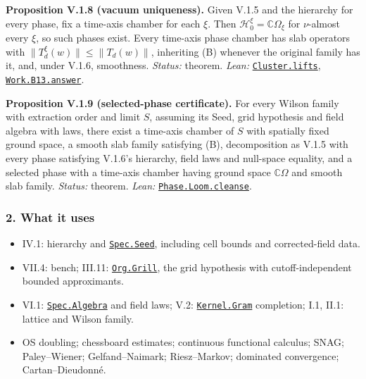 \documentclass[
  letterpaper,
  11pt]{article}
\providecommand{\tightlist}{%
  \setlength{\itemsep}{0pt}\setlength{\parskip}{0pt}}
\begin{document}
\textbf{Proposition V.1.8 (vacuum uniqueness).} Given V.1.5 and the
hierarchy for every phase, fix a time-axis chamber for each \(\xi\).
Then \(\mathcal H_0^\xi=\mathbb C\Omega_\xi\) for \(\nu\)-almost every
\(\xi\), so such phases exist. Every time-axis phase chamber has slab
operators with \(\|T_d^\xi(w)\|\le\|T_d(w)\|\), inheriting (B) whenever
the original family has it, and, under V.1.6, smoothness. \emph{Status:}
theorem. \emph{Lean:}
\href{https://github.com/yang-mills-group/OpenAI-YM-20261028/blob/3456e5e75cf8d4cd558955a5c7638fba2d68f464/YM/Phase/Unique.lean\#L91-L110}{\texttt{Cluster.lifts}},
\href{https://github.com/yang-mills-group/OpenAI-YM-20261028/blob/3456e5e75cf8d4cd558955a5c7638fba2d68f464/YM/Work/B13.lean\#L91-L105}{\texttt{Work.B13.answer}}.

\textbf{Proposition V.1.9 (selected-phase certificate).} For every
Wilson family with extraction order and limit \(S\), assuming its Seed,
grid hypothesis and field algebra with laws, there exist a time-axis
chamber of \(S\) with spatially fixed ground space, a smooth slab family
satisfying (B), decomposition as V.1.5 with every phase satisfying
V.1.6's hierarchy, field laws and null-space equality, and a selected
phase with a time-axis chamber having ground space \(\mathbb C\Omega\)
and smooth slab family. \emph{Status:} theorem. \emph{Lean:}
\href{https://github.com/yang-mills-group/OpenAI-YM-20261028/blob/3456e5e75cf8d4cd558955a5c7638fba2d68f464/YM/Org/Phase.lean\#L60-L76}{\texttt{Phase.Loom.cleanse}}.

\subsubsection{2. What it uses}\label{what-it-uses-20}

\begin{itemize}
\tightlist
\item
  IV.1: hierarchy and
  \href{https://github.com/yang-mills-group/OpenAI-YM-20261028/blob/3456e5e75cf8d4cd558955a5c7638fba2d68f464/YM/Spec/Closed.lean\#L20-L26}{\texttt{Spec.Seed}},
  including cell bounds and corrected-field data.
\item
  VII.4: bench; III.11:
  \href{https://github.com/yang-mills-group/OpenAI-YM-20261028/blob/3456e5e75cf8d4cd558955a5c7638fba2d68f464/YM/Org/Input.lean\#L121-L123}{\texttt{Org.Grill}},
  the grid hypothesis with cutoff-independent bounded approximants.
\item
  VI.1:
  \href{https://github.com/yang-mills-group/OpenAI-YM-20261028/blob/3456e5e75cf8d4cd558955a5c7638fba2d68f464/YM/Spec/Closed.lean\#L28-L31}{\texttt{Spec.Algebra}}
  and field laws; V.2:
  \href{https://github.com/yang-mills-group/OpenAI-YM-20261028/blob/3456e5e75cf8d4cd558955a5c7638fba2d68f464/YM/Hilbert/Kolmogorov.lean\#L34-L38}{\texttt{Kernel.Gram}}
  completion; I.1, II.1: lattice and Wilson family.
\item
  OS doubling; chessboard estimates; continuous functional calculus;
  SNAG; Paley--Wiener; Gelfand--Naimark; Riesz--Markov; dominated
  convergence; Cartan--Dieudonné.
\end{itemize}
\end{document}
